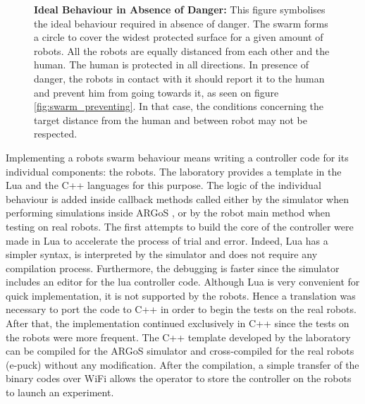 \documentclass[oneside, a4paper, 12pt]{memoir}
\newcommand{\epuck}[3][0] %
{
	\draw [very thick, fill=white] (#2,#3) circle [radius=0.5];
	\draw [very thick, rotate around={#1:(#2,#3)}] (#2-0.25,#3-0.433) -- (#2,#3+0.45) -- (#2+0.25,#3-0.433);
}
\newcommand{\human}[3][0] %
{
	\draw [very thick, fill=white, rotate around={#1:(#2,#3)}] (#2-1,#3+0.5) ellipse (0.25cm and 0.5cm);
	\draw [very thick, fill=white, rotate around={#1:(#2,#3)}] (#2+1,#3+0.5) ellipse (0.25cm and 0.5cm);
	\draw [very thick, fill=white, rotate around={#1:(#2,#3)}] (#2,#3) ellipse (1.5cm and 0.75cm);
	\draw [thick, rotate around={#1:(#2,#3)}] (#2-0.05,#3+1) -- (#2,#3+1.1) -- (#2+0.05,#3+1);
	\draw [very thick, fill=white, rotate around={#1:(#2,#3)}] (#2,#3+0.5) circle [radius=0.5cm];
}
\let\oldCaption\caption
\renewcommand{\caption}[2]{
\oldCaption[#1]{{\small\sffamily\bfseries #1:} #2}
}
\begin{document}
	\begin{figure}[!h]\centering
	\caption{Ideal Behaviour in Absence of Danger}{This figure symbolises the ideal behaviour required in absence of danger. The swarm forms a circle to cover the widest protected surface for a given amount of robots. All the robots are equally distanced from each other and the human. The human is protected in all directions. In presence of danger, the robots in contact with it should report it to the human and prevent him from going towards it, as seen on figure \ref{fig:swarm_preventing}. In that case, the conditions concerning the target distance from the human and between robot may not be respected.}
	\label{fig:circle_shape}
	\end{figure}	
	
	Implementing a robots swarm behaviour means writing a controller code for its individual components: the robots. The laboratory provides a template in the Lua and the C++ languages for this purpose. The logic of the individual behaviour is added inside callback methods called either by the simulator when performing simulations inside ARGoS \citep{pinciroli2012argos}, or by the robot main method when testing on real robots. The first attempts to build the core of the controller were made in Lua to accelerate the process of trial and error. Indeed, Lua has a simpler syntax, is interpreted by the simulator and does not require any compilation process. Furthermore, the debugging is faster since the simulator includes an editor for the lua controller code. Although Lua is very convenient for quick implementation, it is not supported by the robots. Hence a translation was necessary to port the code to C++ in order to begin the tests on the real robots. After that, the implementation continued exclusively in C++ since the tests on the robots were more frequent. The C++ template developed by the laboratory can be compiled for the ARGoS simulator and cross-compiled for the real robots (e-puck) without any modification. After the compilation, a simple transfer of the binary codes over WiFi allows the operator to store the controller on the robots to launch an experiment.\\
	
\end{document}
